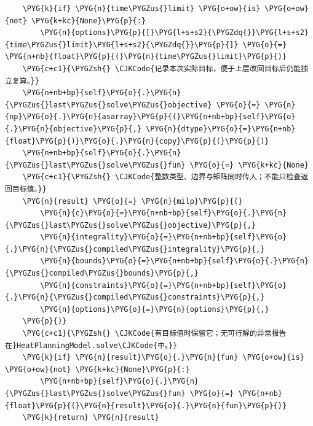 \begin{Verbatim}
    \PYG{k}{if} \PYG{n}{time\PYGZus{}limit} \PYG{o+ow}{is} \PYG{o+ow}{not} \PYG{k+kc}{None}\PYG{p}{:}
        \PYG{n}{options}\PYG{p}{[}\PYG{l+s+s2}{\PYGZdq{}}\PYG{l+s+s2}{time\PYGZus{}limit}\PYG{l+s+s2}{\PYGZdq{}}\PYG{p}{]} \PYG{o}{=} \PYG{n+nb}{float}\PYG{p}{(}\PYG{n}{time\PYGZus{}limit}\PYG{p}{)}
    \PYG{c+c1}{\PYGZsh{} \CJKCode{记录本次实际目标，便于上层改回目标后仍能独立复算。}}
    \PYG{n+nb+bp}{self}\PYG{o}{.}\PYG{n}{\PYGZus{}last\PYGZus{}solve\PYGZus{}objective} \PYG{o}{=} \PYG{n}{np}\PYG{o}{.}\PYG{n}{asarray}\PYG{p}{(}\PYG{n+nb+bp}{self}\PYG{o}{.}\PYG{n}{objective}\PYG{p}{,} \PYG{n}{dtype}\PYG{o}{=}\PYG{n+nb}{float}\PYG{p}{)}\PYG{o}{.}\PYG{n}{copy}\PYG{p}{(}\PYG{p}{)}
    \PYG{n+nb+bp}{self}\PYG{o}{.}\PYG{n}{\PYGZus{}last\PYGZus{}solve\PYGZus{}fun} \PYG{o}{=} \PYG{k+kc}{None}
    \PYG{c+c1}{\PYGZsh{} \CJKCode{整数类型、边界与矩阵同时传入；不能只检查返回目标值。}}
    \PYG{n}{result} \PYG{o}{=} \PYG{n}{milp}\PYG{p}{(}
        \PYG{n}{c}\PYG{o}{=}\PYG{n+nb+bp}{self}\PYG{o}{.}\PYG{n}{\PYGZus{}last\PYGZus{}solve\PYGZus{}objective}\PYG{p}{,}
        \PYG{n}{integrality}\PYG{o}{=}\PYG{n+nb+bp}{self}\PYG{o}{.}\PYG{n}{\PYGZus{}compiled\PYGZus{}integrality}\PYG{p}{,}
        \PYG{n}{bounds}\PYG{o}{=}\PYG{n+nb+bp}{self}\PYG{o}{.}\PYG{n}{\PYGZus{}compiled\PYGZus{}bounds}\PYG{p}{,}
        \PYG{n}{constraints}\PYG{o}{=}\PYG{n+nb+bp}{self}\PYG{o}{.}\PYG{n}{\PYGZus{}compiled\PYGZus{}constraints}\PYG{p}{,}
        \PYG{n}{options}\PYG{o}{=}\PYG{n}{options}\PYG{p}{,}
    \PYG{p}{)}
    \PYG{c+c1}{\PYGZsh{} \CJKCode{有目标值时保留它；无可行解的异常报告在}HeatPlanningModel.solve\CJKCode{中。}}
    \PYG{k}{if} \PYG{n}{result}\PYG{o}{.}\PYG{n}{fun} \PYG{o+ow}{is} \PYG{o+ow}{not} \PYG{k+kc}{None}\PYG{p}{:}
        \PYG{n+nb+bp}{self}\PYG{o}{.}\PYG{n}{\PYGZus{}last\PYGZus{}solve\PYGZus{}fun} \PYG{o}{=} \PYG{n+nb}{float}\PYG{p}{(}\PYG{n}{result}\PYG{o}{.}\PYG{n}{fun}\PYG{p}{)}
    \PYG{k}{return} \PYG{n}{result}
\end{Verbatim}

